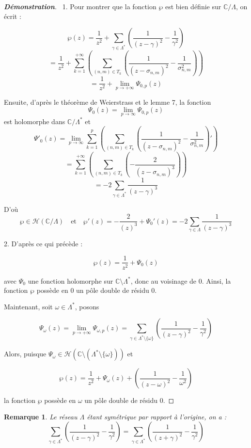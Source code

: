 \documentclass[12pt]{article}
\newtheorem{remark}{Remarque}
\begin{document}
        \begin{proof}[\textbf{Démonstration}]
            \ 1. Pour montrer que la fonction \(\wp\) est bien définie sur \(\mathbb{C}/\Lambda\), on écrit :

        \[
        \wp(z) = \frac{1}{z^2} + \sum_{\gamma \in \Lambda^*} \left( \frac{1}{(z - \gamma)^2} - \frac{1}{\gamma^2} \right)
        \]
        \[
        = \frac{1}{z^2} + \sum_{k =1}^{ + \infty} \left( \sum_{(n,m) \in T_k} \left( \frac{1}{(z - \sigma_{n,m})^2} - \frac{1}{\sigma_{n,m}^2} \right) \right)
        \]
        \[
        = \frac{1}{z^2} + \lim_{p \to + \infty} \Psi_{0,p}(z)
        \]

        Ensuite, d'après le théorème de Weierstrass et le lemme 7, la fonction
        \[
        \Psi_{0}(z) = \lim_{p \to \infty} \Psi_{0,p}(z)
        \]
        est holomorphe dans \(\mathbb{C}/\Lambda^*\) et
        \[
        \Psi'_{0}(z) = \lim_{p \to \infty} \sum_{k=1}^{p} \left( \sum_{(n,m) \in T_k} \left( \frac{1}{(z - \sigma_{n,m})^2} - \frac{1}{\sigma_{n,m}^2} \right)' \right)
        \]
        \[
        = \sum_{k=1}^{ + \infty} \left( \sum_{(n,m) \in T_k} \left( -\frac{2}{(z - \sigma_{n,m})^3} \right) \right)
        \]
        \[
        = -2 \sum_{\gamma \in \Lambda^*} \frac{1}{(z - \gamma)^3}
        \]

        D'où
        \[
        \wp \in \mathcal{H}( \mathbb{C}/\Lambda) \quad \text{et} \quad \wp'(z) = -\frac{2}{(z)^3} + \Psi_0'(z) = -2 \sum_{\gamma \in \Lambda} \frac{1}{(z - \gamma)^3}
        \]

        2. D'après ce qui précède :

        \[
        \wp(z) = \frac{1}{z^2} + \Psi_0(z)
        \]

        avec \(\Psi_0\) une fonction holomorphe sur \(\mathbb{C} \setminus \Lambda^*\), donc au voisinage de 0. Ainsi, la fonction \(\wp\) possède en 0 un pôle double de résidu 0.

        Maintenant, soit \(\omega \in \Lambda^*\), posons

        \[
        \Psi_\omega(z) = \lim_{p \to +\infty} \Psi_{\omega, p}(z) = \sum_{\gamma \in \Lambda^* \setminus \{\omega\}} \left( \frac{1}{(z - \gamma)^2} - \frac{1}{\gamma^2} \right)
        \]

        Alors, puisque \(\Psi_\omega \in \mathcal{H}(\mathbb{C} \setminus (\Lambda^* \setminus \{\omega\}))\) et

        \[
        \wp(z) = \frac{1}{z^2} + \Psi_\omega(z) + \left( \frac{1}{(z - \omega)^2} - \frac{1}{\omega^2} \right)
        \]

        la fonction \(\wp\) possède en \(\omega\) un pôle double de résidu 0.
        \end{proof}
        \begin{remark}
            Le réseau \(\Lambda\) étant symétrique par rapport à l'origine, on a :
            \[
            \sum_{\gamma \in \Lambda^*} \left( \frac{1}{(z - \gamma)^2} - \frac{1}{\gamma^2} \right) = \sum_{\gamma \in \Lambda^*} \left( \frac{1}{(z + \gamma)^2} - \frac{1}{\gamma^2} \right)
            \]
            \end{remark}
\end{document}
